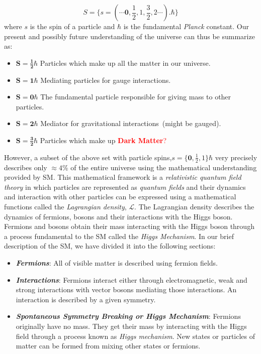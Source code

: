 \begin{equation*}
S =\{s=(\cdots \mathbf{0}, \frac{1}{2}, 1,  \frac{3}{2}, 2  \cdots ).\hbar\}
\end{equation*}
where  $s$ is the spin of a particle and $\hbar$ is the fundamental \textit{Planck} constant. 
Our present and possibly future understanding of the universe can thus be summarize as:
 \begin{itemize}
  \item $\mathbf{S = \frac{1}{2}\hbar}$ Particles which make up all the matter in our universe.
  \item $\mathbf{S = 1\hbar}$ Mediating particles for gauge interactions.
  \item $\mathbf{S = 0\hbar}$ The fundamental particle responsible for giving mass to other particles.
  \item $\mathbf{S = 2\hbar}$ Mediator for gravitational interactions~(might be gauged).
  \item $\mathbf{S = \frac{3}{2}\hbar}$ Particles which make up \textcolor{red}{\textbf{Dark Matter}?}
 \end{itemize}
However, a subset of the above set with particle spins,$s =\{\mathbf{0}, \frac{1}{2}, 1\}\hbar$ very precisely describes only $\approx 4$\% of the entire universe using the mathematical understanding provided by SM. This mathematical framework 
is a \textit{relativistic quantum field theory} in which particles are represented as \textit{quantum fields} and their dynamics and interaction with other particles can be expressed using a mathematical functions called the \textit{Lagrangian density}, $\mathcal{L}$. The Lagrangian density describes the dynamics of fermions, bosons and their interactions with the Higgs boson. Fermions and bosons obtain their mass interacting with the Higgs boson through a process fundamental to the SM called the \textit{Higgs Mechanism}.
In our brief description of the SM, we have divided it into the following sections:

\begin{itemize}
\item \textbf{\textit{Fermions}}: All of visible matter is described using fermion fields.
\item \textbf{\textit{Interactions}}: Fermions interact either through electromagnetic, weak and strong interactions with vector bosons mediating  those interactions. An interaction is described by a given symmetry.
\item \textbf{\textit{Spontaneous Symmetry Breaking or Higgs Mechanism}}: Fermions originally have no mass. They get their mass by interacting with the Higgs field through a process known as \textit{Higgs mechanism}. New states or particles of matter can be formed from mixing other states or fermions.

\end{itemize}
